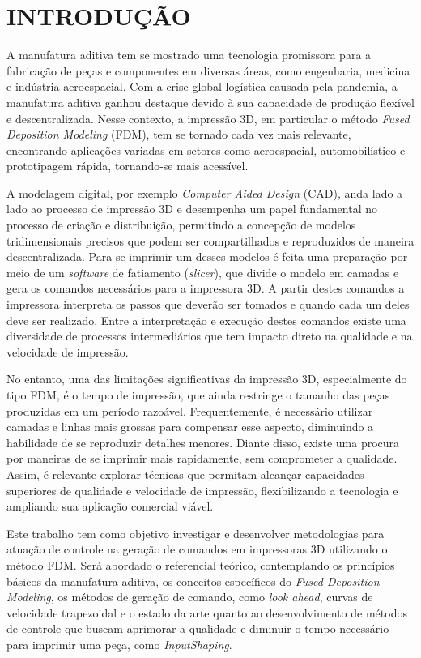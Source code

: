 \chapter{INTRODUÇÃO}
A manufatura aditiva tem se mostrado uma tecnologia promissora para a fabricação de peças e componentes em
diversas áreas, como engenharia, medicina e indústria aeroespacial. Com a crise global logística causada
pela pandemia, a manufatura aditiva ganhou destaque devido à sua capacidade de produção flexível e 
descentralizada. Nesse contexto, a impressão 3D, em particular o método 
\textit{Fused Deposition Modeling} (FDM), tem se tornado cada vez mais relevante, encontrando aplicações 
variadas em setores como aeroespacial, automobilístico e prototipagem rápida, tornando-se mais acessível.

A modelagem digital, por exemplo \textit{Computer Aided Design} (CAD), anda lado a lado ao processo de impressão 3D
e desempenha um papel fundamental no processo de criação e distribuição, permitindo a concepção de modelos 
tridimensionais precisos que podem ser compartilhados e reproduzidos de maneira descentralizada. 
Para se imprimir um desses modelos é feita uma preparação por meio de um \textit{software} de fatiamento 
(\textit{slicer}), que divide o modelo em camadas e gera os comandos necessários para a impressora 3D. 
A partir destes comandos a impressora interpreta os passos que deverão ser tomados e quando cada um deles 
deve ser realizado. Entre a interpretação e execução destes comandos existe uma diversidade de processos 
intermediários que tem impacto direto na qualidade e na velocidade de impressão.

No entanto, uma das limitações significativas da impressão 3D, especialmente do tipo FDM, é o tempo de 
impressão, que ainda restringe o tamanho das peças produzidas em um período razoável. Frequentemente, é 
necessário utilizar camadas e linhas mais grossas para compensar esse aspecto, diminuindo a habilidade de
se reproduzir detalhes menores. Diante disso, existe uma procura por maneiras de se imprimir mais rapidamente, 
sem comprometer a qualidade.
Assim, é relevante explorar técnicas que permitam alcançar capacidades superiores de qualidade e 
velocidade de impressão, flexibilizando a tecnologia e ampliando sua aplicação comercial viável. 

Este trabalho tem como objetivo investigar e desenvolver metodologias para atuação de controle na geração de
comandos em impressoras 3D utilizando o método FDM. Será abordado o referencial teórico, contemplando os 
princípios básicos da manufatura aditiva, os conceitos específicos do \textit{Fused Deposition Modeling}, 
os métodos de geração de comando, como \textit{look ahead}, curvas de velocidade trapezoidal e o estado da 
arte quanto ao desenvolvimento de métodos de controle que buscam aprimorar a qualidade e diminuir o tempo 
necessário para imprimir uma peça, como \textit{InputShaping}.

